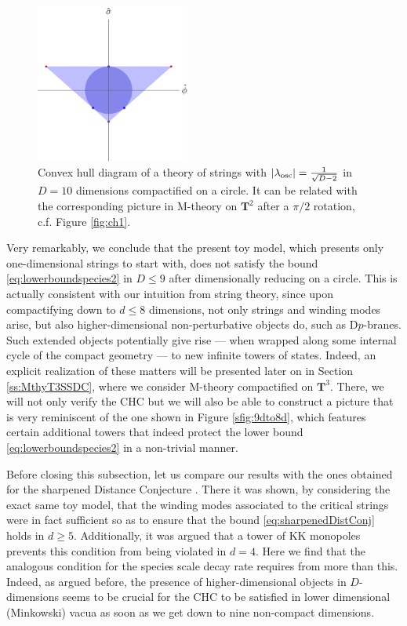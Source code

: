 \begin{figure}[htb]
\begin{center}
\includegraphics[width=0.45\textwidth]{CH-6.pdf}
\caption{\small Convex hull diagram of a theory of strings with $|\lambda_{\rm osc}|=\frac{1}{\sqrt{D-2}}$ in $D=10$ dimensions compactified on a circle. It can be related with the corresponding picture in M-theory on $\mathbf{T}^2$ after a $\pi/2$ rotation, c.f. Figure \ref{fig:ch1}.} 
\label{fig:ch5}
\end{center}
\end{figure}

Very remarkably, we conclude that the present toy model, which presents only one-dimensional strings to start with, does not satisfy the bound \eqref{eq:lowerboundspecies2} in $D\leq 9$ after dimensionally reducing on a circle. This is actually consistent with our intuition from string theory, since upon compactifying down to $d\leq8$ dimensions, not only strings and winding modes arise, but also higher-dimensional non-perturbative objects do, such as D$p$-branes. Such extended objects potentially give rise --- when wrapped along some internal cycle of the compact geometry --- to new infinite towers of states. Indeed, an explicit realization of these matters will be presented later on in Section \ref{ss:MthyT3SSDC}, where we consider M-theory compactified on $\mathbf{T}^3$. There, we will not only verify the CHC but we will also be able to construct a picture that is very reminiscent of the one shown in Figure \ref{sfig:9dto8d}, which features certain additional towers that indeed protect the lower bound \eqref{eq:lowerboundspecies2} in a non-trivial manner.

Before closing this subsection, let us compare our results with the ones obtained for the sharpened Distance Conjecture \cite{Etheredge:2022opl}. There it was shown, by considering the exact same toy model, that the winding modes associated to the critical strings were in fact sufficient so as to ensure that the bound \eqref{eq:sharpenedDistConj} holds in $d\geq5$. Additionally, it was argued that a tower of KK monopoles prevents this condition from being violated in $d=4$. Here we find that the analogous condition for the species scale decay rate requires from more than this. Indeed, as argued before, the presence of higher-dimensional objects in $D$-dimensions seems to be crucial for the CHC to be satisfied in lower dimensional (Minkowski) vacua as soon as we get down to nine non-compact dimensions. %

